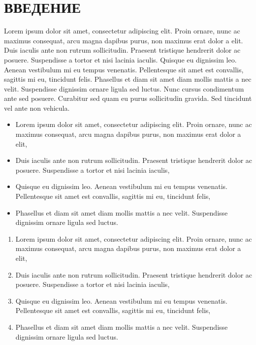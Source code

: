 
\newpage
\section*{ВВЕДЕНИЕ}

Lorem ipsum dolor sit amet, consectetur adipiscing elit. Proin ornare, nunc ac maximus consequat, arcu magna dapibus
purus, non maximus erat dolor a elit. Duis iaculis ante non rutrum sollicitudin. Praesent tristique hendrerit dolor ac
posuere. Suspendisse a tortor et nisi lacinia iaculis. Quisque eu dignissim leo. Aenean vestibulum mi eu tempus
venenatis. Pellentesque sit amet est convallis, sagittis mi eu, tincidunt felis. Phasellus et diam sit amet diam mollis
mattis a nec velit. Suspendisse dignissim ornare ligula sed luctus. Nunc cursus condimentum ante sed posuere. Curabitur
sed quam eu purus sollicitudin gravida. Sed tincidunt vel ante non vehicula.

\begin{itemize}
    \item Lorem ipsum dolor sit amet, consectetur adipiscing elit. Proin ornare, nunc ac maximus consequat, arcu magna
    dapibus purus, non maximus erat dolor a elit,
    \item Duis iaculis ante non rutrum sollicitudin. Praesent tristique hendrerit dolor ac posuere. Suspendisse a tortor
    et nisi lacinia iaculis,
    \item Quisque eu dignissim leo. Aenean vestibulum mi eu tempus venenatis. Pellentesque sit amet est convallis,
    sagittis mi eu, tincidunt felis,
    \item Phasellus et diam sit amet diam mollis mattis a nec velit. Suspendisse dignissim ornare ligula sed luctus.
\end{itemize}

\begin{enumerate}
    \item Lorem ipsum dolor sit amet, consectetur adipiscing elit. Proin ornare, nunc ac maximus consequat, arcu magna
    dapibus purus, non maximus erat dolor a elit,
    \item Duis iaculis ante non rutrum sollicitudin. Praesent tristique hendrerit dolor ac posuere. Suspendisse a tortor
    et nisi lacinia iaculis,
    \item Quisque eu dignissim leo. Aenean vestibulum mi eu tempus venenatis. Pellentesque sit amet est convallis,
    sagittis mi eu, tincidunt felis,
    \item Phasellus et diam sit amet diam mollis mattis a nec velit. Suspendisse dignissim ornare ligula sed luctus.
\end{enumerate}

